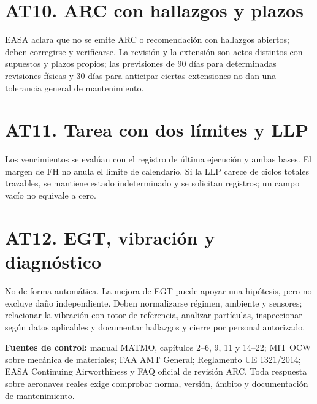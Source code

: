 \section*{AT10. ARC con hallazgos y plazos}
EASA aclara que no se emite ARC o recomendación con hallazgos abiertos; deben corregirse y verificarse. La revisión y la extensión son actos distintos con supuestos y plazos propios; las previsiones de 90 días para determinadas revisiones físicas y 30 días para anticipar ciertas extensiones no dan una tolerancia general de mantenimiento.

\section*{AT11. Tarea con dos límites y LLP}
Los vencimientos se evalúan con el registro de última ejecución y ambas bases. El margen de FH no anula el límite de calendario. Si la LLP carece de ciclos totales trazables, se mantiene estado indeterminado y se solicitan registros; un campo vacío no equivale a cero.

\section*{AT12. EGT, vibración y diagnóstico}
No de forma automática. La mejora de EGT puede apoyar una hipótesis, pero no excluye daño independiente. Deben normalizarse régimen, ambiente y sensores; relacionar la vibración con rotor de referencia, analizar partículas, inspeccionar según datos aplicables y documentar hallazgos y cierre por personal autorizado.

\noindent\textbf{Fuentes de control:} manual MATMO, capítulos 2--6, 9, 11 y 14--22; MIT OCW sobre mecánica de materiales; FAA AMT General; Reglamento UE 1321/2014; EASA Continuing Airworthiness y FAQ oficial de revisión ARC. Toda respuesta sobre aeronaves reales exige comprobar norma, versión, ámbito y documentación de mantenimiento.

